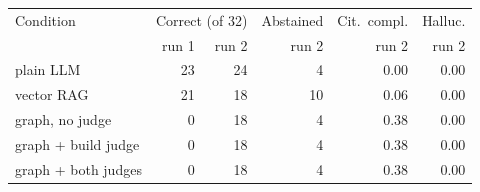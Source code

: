 \begin{tabular}{lrrrrr}
\toprule
Condition & \multicolumn{2}{c}{Correct (of 32)} & Abstained & Cit.\ compl. & Halluc. \\
 & run 1 & run 2 & run 2 & run 2 & run 2 \\
\midrule
plain LLM & 23 & 24 & 4 & 0.00 & 0.00 \\
vector RAG & 21 & 18 & 10 & 0.06 & 0.00 \\
graph, no judge & 0 & 18 & 4 & 0.38 & 0.00 \\
graph + build judge & 0 & 18 & 4 & 0.38 & 0.00 \\
graph + both judges & 0 & 18 & 4 & 0.38 & 0.00 \\
\bottomrule
\end{tabular}

